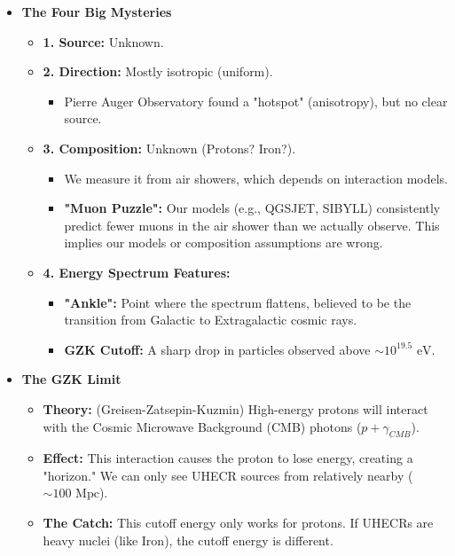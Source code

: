 \documentclass{sciposter}
\begin{document}
\begin{multicols}{3}
\begin{itemize}
    \item \textbf{The Four Big Mysteries}
    \begin{itemize}
        \item \textbf{1. Source:} Unknown.
        \item \textbf{2. Direction:} Mostly isotropic (uniform).
            \begin{itemize}
                \item Pierre Auger Observatory found a "hotspot" (anisotropy), but no clear source.
            \end{itemize}
        \item \textbf{3. Composition:} Unknown (Protons? Iron?).
            \begin{itemize}
                \item We measure it from air showers, which depends on interaction models.
                \item \textbf{"Muon Puzzle":} Our models (e.g., QGSJET, SIBYLL) consistently predict fewer muons in the air shower than we actually observe. This implies our models or composition assumptions are wrong.
            \end{itemize}
        \item \textbf{4. Energy Spectrum Features:}
            \begin{itemize}
                \item \textbf{"Ankle":} Point where the spectrum flattens, believed to be the transition from Galactic to Extragalactic cosmic rays.
                \item \textbf{GZK Cutoff:} A sharp drop in particles observed above $\sim 10^{19.5} \text{ eV}$.
            \end{itemize}
    \end{itemize}

    \item \textbf{The GZK Limit}
    \begin{itemize}
        \item \textbf{Theory:} (Greisen-Zatsepin-Kuzmin) High-energy protons will interact with the Cosmic Microwave Background (CMB) photons ($p + \gamma_{CMB}$).
        \item \textbf{Effect:} This interaction causes the proton to lose energy, creating a "horizon." We can only see UHECR sources from relatively nearby ($\sim 100 \text{ Mpc}$).
        \item \textbf{The Catch:} This cutoff energy only works for protons. If UHECRs are heavy nuclei (like Iron), the cutoff energy is different.
    \end{itemize}


\end{itemize}
\end{multicols}
\end{document}
